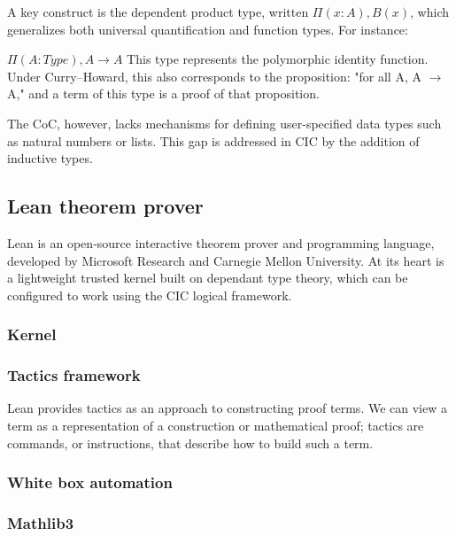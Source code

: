 A key construct is the dependent product type, written $\Pi (x : A), B(x)$, which generalizes both universal quantification and function types. For instance:

$\Pi (A : Type), A \rightarrow A$
This type represents the polymorphic identity function. Under Curry–Howard, this also corresponds to the proposition: "for all A, A $\rightarrow$ A," and a term of this type is a proof of that proposition.

The CoC, however, lacks mechanisms for defining user-specified data types such as natural numbers or lists. This gap is addressed in CIC by the addition of inductive types.

\subsection{Lean theorem prover}
Lean is an open‑source interactive theorem prover and programming language, developed by Microsoft Research and Carnegie Mellon University. At its heart is a lightweight trusted kernel built on dependant type theory, which can be configured to work using the CIC logical framework.
\subsubsection{Kernel}
\subsubsection{Tactics framework}
Lean provides tactics as an approach to constructing proof terms.
We can view a term as a representation of a construction or mathematical
proof; tactics are commands, or instructions, that describe how to build such a
term.
\subsubsection{White box automation}
\subsubsection{Mathlib3}
